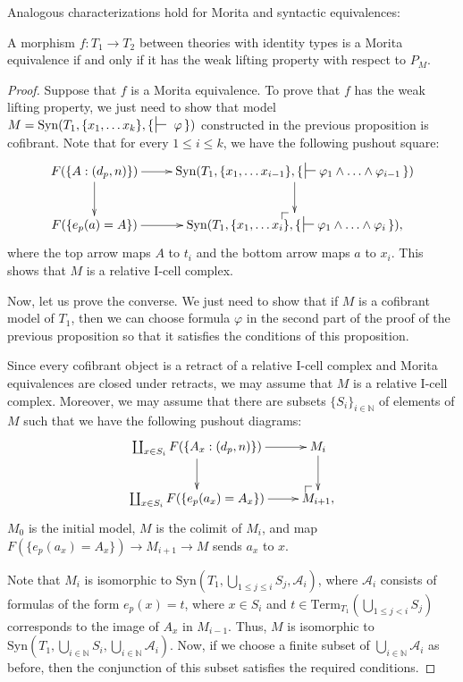 \documentclass[reqno]{amsart}
\makeatletter
\theoremstyle{definition}
\theoremstyle{remark}
\newcommand{\Syn}{\mathrm{Syn}}
\newcommand{\Term}{\mathrm{Term}}
\newcommand{\I}{\mathrm{I}}
\numberwithin{figure}{section}
\newcommand{\po}[1][dr]{\save*!/#1+1.2pc/#1:(1,-1)@^{|-}\restore}
\makeatother
\begin{document}
Analogous characterizations hold for Morita and syntactic equivalences:

\begin{prop}
A morphism $f : T_1 \to T_2$ between theories with identity types is a Morita equivalence if and only if it has the weak lifting property with respect to $P_M$.
\end{prop}
\begin{proof}
Suppose that $f$ is a Morita equivalence.
To prove that $f$ has the weak lifting property, we just need to show that model $M = \Syn(T_1, \{ x_1, \ldots x_k \}, \{\,\sststile{}{}~\varphi\,\})$
constructed in the previous proposition is cofibrant.
Note that for every $1 \leq i \leq k$, we have the following pushout square:
\[ \xymatrix{ F(\{ A : (d_p,n) \}) \ar[d] \ar[r] &     \Syn(T_1, \{ x_1, \ldots x_{i-1} \}, \{\,\sststile{}{} \varphi_1 \land \ldots \land \varphi_{i-1} \,\}) \ar[d] \\
              F(\{ e_p(a) = A \})         \ar[r] & \po \Syn(T_1, \{ x_1, \ldots x_i \}, \{\,\sststile{}{} \varphi_1 \land \ldots \land \varphi_i \,\}),
            } \]
where the top arrow maps $A$ to $t_i$ and the bottom arrow maps $a$ to $x_i$.
This shows that $M$ is a relative $\I$-cell complex.

Now, let us prove the converse.
We just need to show that if $M$ is a cofibrant model of $T_1$, then we can choose formula $\varphi$
in the second part of the proof of the previous proposition so that it satisfies the conditions of this proposition.

Since every cofibrant object is a retract of a relative $\I$-cell complex and Morita equivalences are closed under retracts, we may assume that $M$ is a relative $\I$-cell complex.
Moreover, we may assume that there are subsets $\{S_i\}_{i \in \mathbb{N}}$ of elements of $M$ such that we have the following pushout diagrams:
\[ \xymatrix{ \coprod_{x \in S_i} F(\{ A_x : (d_p,n) \}) \ar[d] \ar[r] &     M_i \ar[d] \\
              \coprod_{x \in S_i} F(\{ e_p(a_x) = A_x \})       \ar[r] & \po M_{i+1},
            } \]
$M_0$ is the initial model, $M$ is the colimit of $M_i$, and map $F(\{ e_p(a_x) = A_x \}) \to M_{i+1} \to M$ sends $a_x$ to $x$.

Note that $M_i$ is isomorphic to $\Syn(T_1, \bigcup_{1 \leq j \leq i} S_j, \mathcal{A}_i)$,
where $\mathcal{A}_i$ consists of formulas of the form $e_p(x) = t$, where $x \in S_i$ and $t \in \Term_{T_1}(\bigcup_{1 \leq j < i} S_j)$ corresponds to the image of $A_x$ in $M_{i-1}$.
Thus, $M$ is isomorphic to $\Syn(T_1, \bigcup_{i \in \mathbb{N}} S_i, \bigcup_{i \in \mathbb{N}} \mathcal{A}_i)$.
Now, if we choose a finite subset of $\bigcup_{i \in \mathbb{N}} \mathcal{A}_i$ as before, then the conjunction of this subset satisfies the required conditions.
\end{proof}
\end{document}
